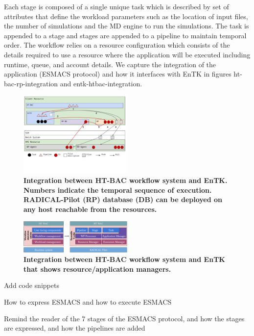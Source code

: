 
Each stage is composed of a single unique task which is described by set of attributes that define the workload parameters such as the location of input files, the number of simulations and the MD engine to run the simulations. The task is appended to a stage and stages are appended to a pipeline to maintain temporal order. The workflow relies on a resource configuration which consists of the details required to use a resource where the application will be executed including runtime, queue, and account details. We capture the integration of the application (ESMACS protocol) and how it interfaces with EnTK in figures ht-bac-rp-integration and entk-htbac-integration. 


\begin{figure}[tb]
\centering
  \includegraphics[width=0.5\textwidth]{FIGURES/ht-bac-rp_integration.pdf}
  \caption{\bf Integration between HT-BAC workflow system and EnTK. Numbers indicate the temporal sequence of execution. RADICAL-Pilot (RP) database (DB) can be deployed on any host reachable from the resources.}
   \label{figure:ht-bac_rp}
\end{figure}

\begin{figure}[ht]
\centering
  \includegraphics[width=0.5\textwidth]{FIGURES/entk_htbac_integration.pdf}
  \caption{\bf Integration between HT-BAC workflow system and EnTK that shows resource/application managers.}
   \label{figure:ht-bac_entk}
\end{figure}

Add code snippets 

How to express ESMACS and how to execute ESMACS


Remind the reader of the 7 stages of the ESMACS protocol, and how the stages are expressed, and how the pipelines are added 


